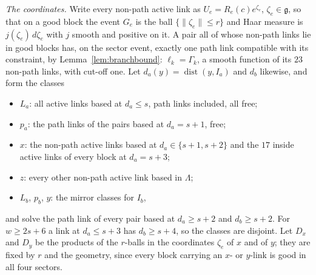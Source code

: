 \documentclass[11pt]{amsart}
\theoremstyle{definition}
\theoremstyle{remark}
\numberwithin{equation}{section}
\newcommand{\g}{\mathfrak{g}}
\newcommand{\dist}{\operatorname{dist}}
\begin{document}
\emph{The coordinates.} Write every non-path active link as
$U_e=R_e(c)e^{\zeta_e}$, $\zeta_e\in\g$, so that on a good block the event
$G_e$ is the ball $\{\lVert\zeta_e\rVert\le r\}$ and Haar measure is
$j(\zeta_e)\,d\zeta_e$ with $j$ smooth and positive on it. A pair all of
whose non-path links lie in good blocks has, on the sector event, exactly
one path link compatible with its constraint, by
Lemma~\ref{lem:branchbound}: $\ell_k=\Gamma_k$, a smooth function of its
$23$ non-path links, with cut-off one. Let $d_a(y)=\dist(y,I_a)$ and
$d_b$ likewise, and form the classes
\begin{itemize}[leftmargin=*]
\item $L_a$: all active links based at $d_a\le s$, path links included,
all free;
\item $p_a$: the path links of the pairs based at $d_a=s+1$, free;
\item $x$: the non-path active links based at $d_a\in\{s+1,s+2\}$ and the
$17$ inside active links of every block at $d_a=s+3$;
\item $z$: every other non-path active link based in $\Lambda$;
\item $L_b$, $p_b$, $y$: the mirror classes for $I_b$,
\end{itemize}
and solve the path link of every pair based at $d_a\ge s+2$ and
$d_b\ge s+2$. For $w\ge2s+6$ a link at $d_a\le s+3$ has $d_b\ge s+4$, so
the classes are disjoint. Let $D_x$ and $D_y$ be the products of the
$r$-balls in the coordinates $\zeta_e$ of $x$ and of $y$; they are fixed
by $r$ and the geometry, since every block carrying an $x$- or $y$-link is
good in all four sectors.
\end{document}
